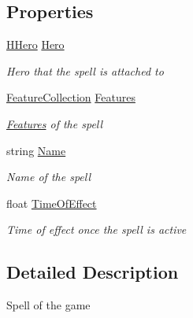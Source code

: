 \subsection*{Properties}
\begin{DoxyCompactItemize}
\item 
\hyperlink{class_hel_project_1_1_game_world_1_1_entities_1_1_h_hero}{H\+Hero} \hyperlink{class_hel_project_1_1_game_world_1_1_spells_1_1_h_spell_a1867f356bf0a68b755703db7e556cbbd}{Hero}
\begin{DoxyCompactList}\small\item\em Hero that the spell is attached to \end{DoxyCompactList}\item 
\hyperlink{class_hel_project_1_1_features_1_1_feature_collection}{Feature\+Collection} \hyperlink{class_hel_project_1_1_game_world_1_1_spells_1_1_h_spell_a404a775604d84ff622ecc2a72cf5f91a}{Features}
\begin{DoxyCompactList}\small\item\em \hyperlink{namespace_hel_project_1_1_features}{Features} of the spell \end{DoxyCompactList}\item 
string \hyperlink{class_hel_project_1_1_game_world_1_1_spells_1_1_h_spell_a66d41a1b498d10e9d77229bdb39fd783}{Name}
\begin{DoxyCompactList}\small\item\em Name of the spell \end{DoxyCompactList}\item 
float \hyperlink{class_hel_project_1_1_game_world_1_1_spells_1_1_h_spell_ae6cb50ade7feb332679ed6b45079d1ce}{Time\+Of\+Effect}
\begin{DoxyCompactList}\small\item\em Time of effect once the spell is active \end{DoxyCompactList}\end{DoxyCompactItemize}


\subsection{Detailed Description}
Spell of the game 



